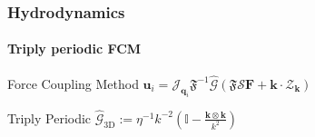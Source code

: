 \documentclass[xcolor=dvipsnames, compress]{beamer}
\newcommand{\ppos}{q}
\renewcommand{\vec}[1]{\bm{#1}}
\newcommand{\tens}[1]{\bm{\mathcal{#1}}}
\newcommand{\oper}[1]{\mathcal{#1}}
\newcommand{\fou}[1]{\widehat{#1}}
\begin{document}
\begin{frame}
\begin{columns}[T]
\begin{column}{0.63\linewidth}
{\begin{overlayarea}{\linewidth}{0.3\paperheight}
{            }%
            \onslide<7->{\centering $\oper{G} :=-\eta^{-1}\nabla^{-2}\left(\mathbb{I} - \nabla\nabla^{-2}\nabla\right)$\\}%
          \end{overlayarea}
        }
      \end{column}
    \end{columns}
  \end{frame}


\begin{frame}
  \frametitle{Hydrodynamics}
  \framesubtitle{Triply periodic FCM}
  \begin{block}{\huge\centering Force Coupling Method}
    \huge\centering$\vec{u}_i = \oper{J}_{\vec{\ppos}_i}\mathfrak{F}^{-1}\fou{\oper{G}}(\mathfrak{F}\oper{S}\vec{F} + \vec{k}\cdot\mathcal Z_{\vec{k}})$
  \end{block}
  \begin{block}{\huge\centering Triply Periodic}
    \huge\centering $\fou{\oper{G}}_{\text{3D}} :=\eta^{-1}k^{-2}\left(\mathbb{I} - \frac{\vec{k}\otimes\vec{k}}{k^2}\right)$
  \end{block}
\end{frame}
\end{document}
